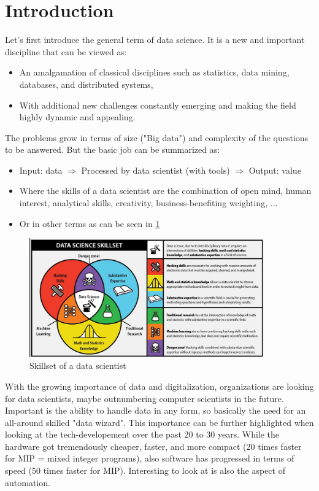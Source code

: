 \section*{Introduction}
\setcounter{figure}{0}

Let's first introduce the general term of data science. It is a new and important discipline that can be viewed as:
\begin{itemize}
  \item An amalgamation of classical disciplines such as statistics, data mining, databases, and distributed systems,
  \item With additional new challenges constantly emerging and making the field highly dynamic and appealing.
\end{itemize} 
The problems grow in terms of size ("Big data") and complexity of the questions to be answered. But the basic job can be summarized as:
\begin{itemize}
  \item Input: data $\Rightarrow$ Processed by data scientist (with tools) $\Rightarrow$ Output: value
  \item Where the skills of a data scientist are the combination of open mind, human interest, analytical skills, creativity, business-benefiting weighting, $\dots$
  \item Or in other terms as can be seen in \ref{fig:0_skillset}
\end{itemize}

\begin{figure}[H]
  \centering
  \includegraphics[width=0.9\textwidth]{assets/intro/data_scientist_skillset.png} 
  \caption{Skillset of a data scientist}
  \label{fig:0_skillset}
\end{figure}

With the growing importance of data and digitalization, organizations are looking for data scientists, maybe outnumbering computer scientists in the future. Important is the ability to handle data in any form, so basically the need for an all-around skilled "data wizard". This importance can be further highlighted when looking at the tech-developement over the past 20 to 30 years. While the hardware got tremendously cheaper, faster, and more compact (20 times faster for MIP = mixed integer programs), also software has progressed in terms of speed (50 times faster for MIP). Interesting to look at is also the aspect of automation.

